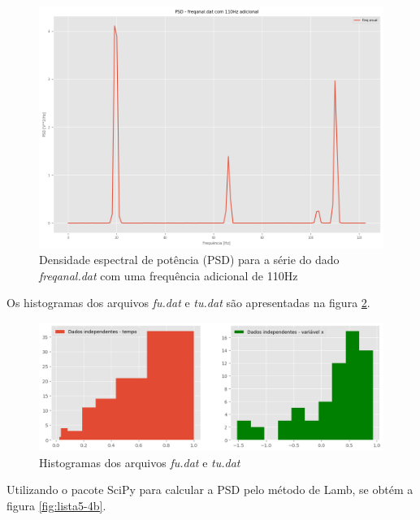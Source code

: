 \documentclass[12pt,a4paper,portuguese]{article}
\begin{document}
\begin{figure}[H]
	\centering
	\includegraphics[width=1\linewidth]{lista5-3b}
	\caption{Densidade espectral de potência (PSD) para a série do dado \textit{freqanal.dat} com  uma frequência adicional de 110Hz }
	\label{fig:lista5-3b}
\end{figure}


Os histogramas dos arquivos \textit{fu.dat} e \textit{tu.dat} são apresentadas na figura \ref{fig:lista5-4a}.

\begin{figure}[H]
	\centering
	\includegraphics[width=1\linewidth]{lista5-4a}
	\caption{Histogramas dos arquivos \textit{fu.dat} e \textit{tu.dat}}
	\label{fig:lista5-4a}
\end{figure}

Utilizando o pacote SciPy para calcular a PSD pelo método de Lamb, se obtém a figura \ref{fig:lista5-4b}.
\end{document}
